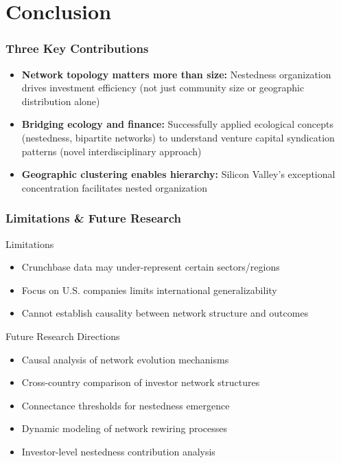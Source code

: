 \section{Conclusion}

\begin{frame}
\frametitle{Three Key Contributions}
\begin{itemize}
  \item[1.] \textbf{Network topology matters more than size:} Nestedness organization drives investment efficiency (not just community size or geographic distribution alone)
  \vspace{0.5cm}
  \item[2.] \textbf{Bridging ecology and finance:} Successfully applied ecological concepts (nestedness, bipartite networks) to understand venture capital syndication patterns (novel interdisciplinary approach)
  \vspace{0.5cm}
  \item[3.] \textbf{Geographic clustering enables hierarchy:} Silicon Valley's exceptional concentration facilitates nested organization
\end{itemize}
\end{frame}

\begin{frame}
\frametitle{Limitations \& Future Research}

\begin{block}{Limitations}
\begin{itemize}
    \item Crunchbase data may under-represent certain sectors/regions
    \item Focus on U.S. companies limits international generalizability
    \item Cannot establish causality between network structure and outcomes
\end{itemize}
\end{block}

\begin{block}{Future Research Directions}
\begin{itemize}
    \item Causal analysis of network evolution mechanisms
    \item Cross-country comparison of investor network structures
    \item Connectance thresholds for nestedness emergence
    \item Dynamic modeling of network rewiring processes
    \item Investor-level nestedness contribution analysis
\end{itemize}
\end{block}

\end{frame}


